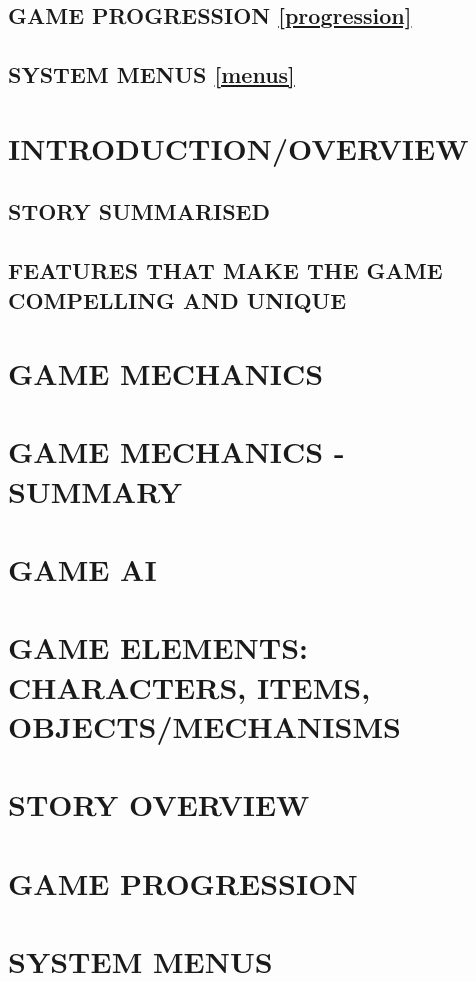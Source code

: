 \documentclass{article}
\begin{document}
%

\subsection{GAME PROGRESSION \ref{progression}}

%

\subsection{SYSTEM MENUS \ref{menus}}


\section{INTRODUCTION/OVERVIEW \label{intro}}

\subsection{STORY SUMMARISED \label{storysumm}}

\subsection{FEATURES THAT MAKE THE GAME COMPELLING AND UNIQUE \label{features}}

\section{GAME MECHANICS \label{mechanics}}

\section{GAME MECHANICS - SUMMARY \label{mechanicssumm}}

\section{GAME AI \label{ai}}

\section{GAME ELEMENTS: CHARACTERS, ITEMS, OBJECTS/MECHANISMS \label{elements}}

\section{STORY OVERVIEW \label{storyover}}

\section{GAME PROGRESSION \label{progression}}

\section{SYSTEM MENUS \label{menus}}
\end{document}
